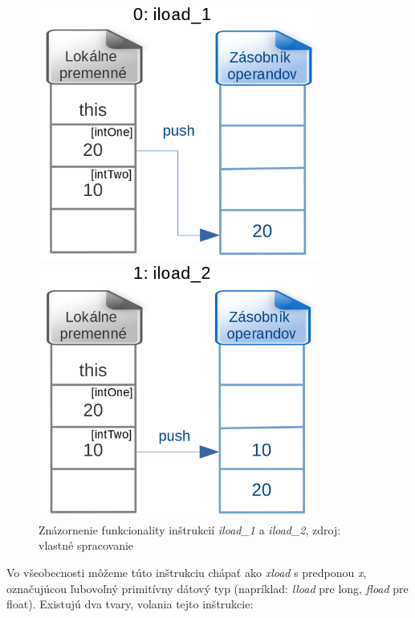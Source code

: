 \documentclass[11pt,final,oneside]{fithesis}
\begin{document}
\begin{figure}[H]
  \begin{minipage}{0.55\textwidth}
     \includegraphics[width=0.825\textwidth]{iload_1.png}
  \end{minipage}
  \begin{minipage}{0.55\textwidth}
     \includegraphics[width=0.825\textwidth]{iload_2.png}
  \end{minipage}
  \caption{Znázornenie funkcionality inštrukcií \textit{iload\_1} a
  \textit{iload\_2}, zdroj: vlastné spracovanie}
  \label{fig:gTiload}
\end{figure}

Vo všeobecnosti môžeme túto inštrukciu chápať ako \textit{xload} s predponou
\textit{x}, označujúcou ľubovoľný primitívny dátový typ (napríklad: 
\textit{lload} pre long, \textit{fload} pre float). Existujú dva tvary, volania
tejto inštrukcie: 
\end{document}
